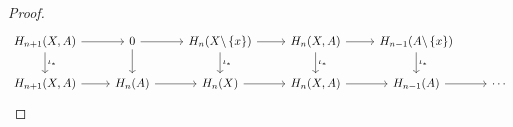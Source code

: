\documentclass[12pt]{article}
\theoremstyle{definition}
\newenvironment{problem}[2][Problem]{\begin{trivlist}
\item[\hskip \labelsep {\bfseries #1}\hskip \labelsep {\bfseries #2.}]}{\end{trivlist}}
\begin{document}
\begin{problem}{1}
\begin{proof}
		\[\begin{tikzcd} H_{n+1}(X, A) \arrow[d, "\iota_*"]\arrow[r] & 0 \arrow[d] \arrow [r] & H_n(X \backslash \left\{ x \right\}) \arrow[d, "\iota_*"] \arrow[r] & H_n(X, A) \arrow[d, "\iota_*"] \arrow[r] & H_{n-1}(A \backslash \left\{ x \right\}) \arrow[d, "\iota_*"]\\
		H_{n+1}(X,A) \arrow[r] &H_n(A) \arrow[r] &H_n(X) \arrow[r] & H_n(X,A) \arrow[r] & H_{n-1}(A) \arrow[r] & \cdots \end{tikzcd}\]

	\end{proof}
\end{problem}
\end{document}
